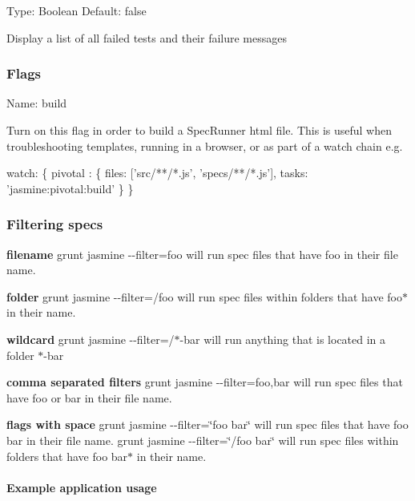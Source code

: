 Type\+: {\ttfamily Boolean} Default\+: {\ttfamily false}

Display a list of all failed tests and their failure messages

\subsubsection*{Flags}

Name\+: {\ttfamily build}

Turn on this flag in order to build a Spec\+Runner html file. This is useful when troubleshooting templates, running in a browser, or as part of a watch chain e.\+g.


\begin{DoxyCode}
watch: \{
  pivotal : \{
    files: [\textcolor{stringliteral}{'src/**/*.js'}, \textcolor{stringliteral}{'specs/**/*.js'}],
    tasks: \textcolor{stringliteral}{'jasmine:pivotal:build'}
  \}
\}
\end{DoxyCode}


\subsubsection*{Filtering specs}

{\bfseries filename} {\ttfamily grunt jasmine -\/-\/filter=foo} will run spec files that have {\ttfamily foo} in their file name.

{\bfseries folder} {\ttfamily grunt jasmine -\/-\/filter=/foo} will run spec files within folders that have {\ttfamily foo$\ast$} in their name.

{\bfseries wildcard} {\ttfamily grunt jasmine -\/-\/filter=/$\ast$-\/bar} will run anything that is located in a folder {\ttfamily $\ast$-\/bar}

{\bfseries comma separated filters} {\ttfamily grunt jasmine -\/-\/filter=foo,bar} will run spec files that have {\ttfamily foo} or {\ttfamily bar} in their file name.

{\bfseries flags with space} {\ttfamily grunt jasmine -\/-\/filter=\char`\"{}foo bar\char`\"{}} will run spec files that have {\ttfamily foo bar} in their file name. {\ttfamily grunt jasmine -\/-\/filter=\char`\"{}/foo bar\char`\"{}} will run spec files within folders that have {\ttfamily foo bar$\ast$} in their name.

\paragraph*{Example application usage}


